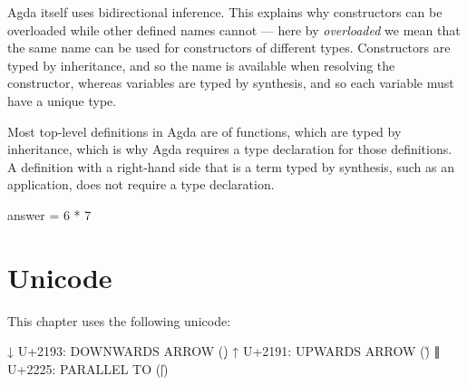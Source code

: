 Agda itself uses bidirectional inference. This explains why constructors
can be overloaded while other defined names cannot --- here by
\emph{overloaded} we mean that the same name can be used for
constructors of different types. Constructors are typed by inheritance,
and so the name is available when resolving the constructor, whereas
variables are typed by synthesis, and so each variable must have a
unique type.

Most top-level definitions in Agda are of functions, which are typed by
inheritance, which is why Agda requires a type declaration for those
definitions. A definition with a right-hand side that is a term typed by
synthesis, such as an application, does not require a type declaration.

\begin{fence}
\begin{code}
answer = 6 * 7
\end{code}
\end{fence}

\hypertarget{unicode}{%
\section{Unicode}\label{unicode}}

This chapter uses the following unicode:

\begin{myDisplay}
↓  U+2193:  DOWNWARDS ARROW (\d)
↑  U+2191:  UPWARDS ARROW (\u)
∥  U+2225:  PARALLEL TO (\||)
\end{myDisplay}

